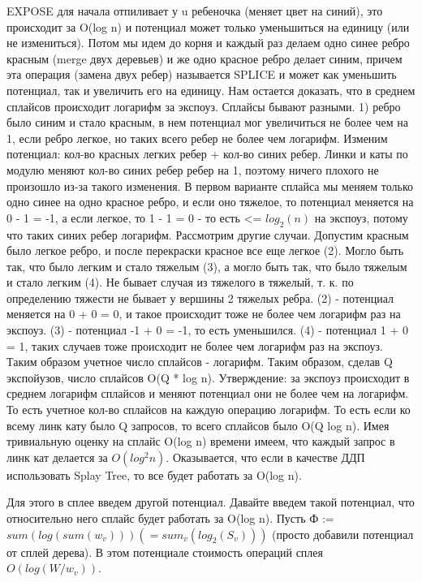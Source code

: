 EXPOSE для начала отпиливает у u ребеночка (меняет цвет на синий), это происходит за O(log n) и потенциал может только уменьшиться на единицу (или не измениться). Потом мы идем до корня и каждый раз делаем одно синее ребро красным (merge двух деревьев) и же одно красное ребро делает синим, причем эта операция (замена двух ребер) называется SPLICE и может как уменьшить потенциал, так и увеличить его на единицу. Нам остается доказать, что в среднем сплайсов происходит логарифм за экспоуз. Сплайсы бывают разными. 1) ребро было синим и стало красным, в нем потенциал мог увеличиться не более чем на 1, если ребро легкое, но таких всего ребер не более чем логарифм.
Изменим потенциал: кол-во красных легких ребер + кол-во синих ребер. Линки и каты по модулю меняют кол-во синих ребер ребер на 1, поэтому ничего плохого не произошло из-за такого изменения.
В первом варианте сплайса мы меняем только одно синее на одно красное ребро, и если оно тяжелое, то потенциал меняется на 0 - 1 = -1, а если легкое, то 1 - 1 = 0 - то есть <= $log_2(n)$ на экспоуз, потому что таких синих ребер логарифм. Рассмотрим другие случаи. Допустим красным было легкое ребро, и после перекраски красное все еще легкое (2). Могло быть так, что было легким и стало тяжелым (3), а могло быть так, что было тяжелым и стало легким (4). Не бывает случая из тяжелого в тяжелый, т. к. по определению тяжести не бывает у вершины 2 тяжелых ребра.
(2) - потенциал меняется на 0 + 0 = 0, и такое происходит тоже не более чем логарифм раз на экспоуз.
(3) - потенциал -1 + 0 = -1, то есть уменьшился.
(4) - потенциал 1 + 0 = 1, таких случаев тоже происходит не более чем логарифм раз на экспоуз.
Таким образом учетное число сплайсов - логарифм. Таким образом, сделав Q экспойузов, число сплайсов O(Q * log n). Утверждение: за экспоуз происходит в среднем логарифм сплайсов и меняют потенциал они не более чем на логарифм. То есть учетное кол-во сплайсов на каждую операцию логарифм. То есть если ко всему линк кату было Q запросов, то всего сплайсов было O(Q log n). Имея тривиальную оценку на сплайс O(log n) времени имеем, что каждый запрос в линк кат делается за $O(log^2 n)$. Оказывается, что если в качестве ДДП использовать Splay Tree, то все будет работать за O(log n). 

Для этого в сплее введем другой потенциал. Давайте введем такой потенциал, что относительно него сплайс будет работать за O(log n). Пусть Ф := $sum(log(sum(w_v))) (= sum_{v}(log_2(S_v)))$ (просто добавили потенциал от сплей дерева). В этом потенциале стоимость операций сплея $O(log(W/w_v))$.

